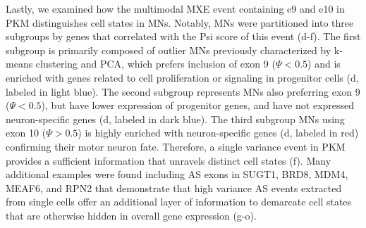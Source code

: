 Lastly, we examined how the multimodal MXE event containing e9 and e10 in PKM distinguishes cell states in MNs. Notably, MNs were partitioned into three subgroups by genes that correlated with the Psi score of this event (d-f). The first subgroup is primarily composed of outlier MNs previously characterized by k-means clustering and PCA, which prefers inclusion of exon 9 ($\Psi < 0.5$) and is enriched with genes related to cell proliferation or signaling in progenitor cells (d, labeled in light blue). The second subgroup represents MNs also preferring exon 9 ($\Psi < 0.5$), but have lower expression of progenitor genes, and have not expressed neuron-specific genes (d, labeled in dark blue). The third subgroup MNs using exon 10 ($\Psi > 0.5$) is highly enriched with neuron-specific genes (d, labeled in red) confirming their motor neuron fate. Therefore, a single variance event in PKM provides a sufficient information that unravels distinct cell states (f). Many additional examples were found including AS exons in SUGT1, BRD8, MDM4, MEAF6, and RPN2 that demonstrate that high variance AS events extracted from single cells offer an additional layer of information to demarcate cell states that are otherwise hidden in overall gene expression (g-o).






